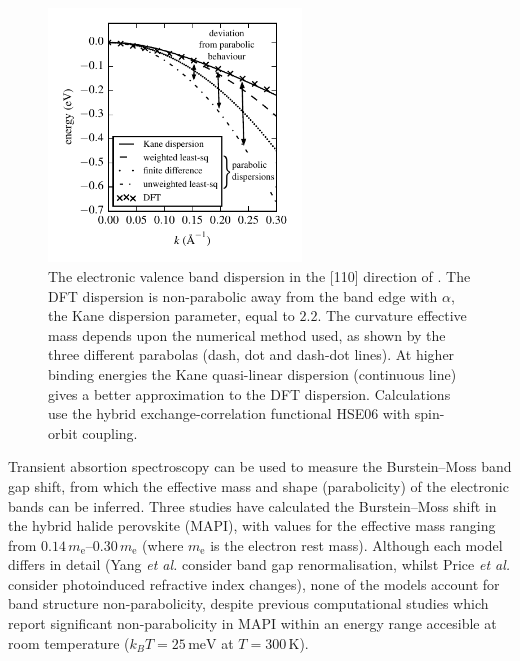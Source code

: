 \begin{figure}[tb] \centering
\includegraphics[width=0.6\textwidth]{./figures/ch4/fits_to_dispersion.pdf}
\caption[Numerical methods for fitting a band dispersion]{\label{dispersion_fits} The electronic valence band dispersion in the [110] direction of . The DFT dispersion is non-parabolic away from the band edge with $\alpha$, the Kane dispersion parameter, equal to ${2.2}$. The curvature effective mass depends upon the numerical method used, as shown by the three different parabolas (dash, dot and dash-dot lines). At higher binding energies the Kane quasi-linear dispersion (continuous line) gives a better approximation to the DFT dispersion. Calculations use the hybrid exchange-correlation functional HSE06 with spin-orbit coupling.}
\end{figure}

Transient absortion spectroscopy can be used to measure the Burstein--Moss band gap shift, from which the effective mass and shape (parabolicity) of the electronic bands can be inferred.
Three studies have calculated the Burstein--Moss shift in the hybrid halide perovskite  (MAPI), with values for the effective mass ranging from $0.14\,m_{\text{e}}$--$0.30\,m_{\text{e}}$ (where $m_{\text{e}}$ is the electron rest mass).\autocite{Manser2014,Yang2015,Price2015}
Although each model differs in detail (Yang \textit{et al.} consider band gap renormalisation,\autocite{Yang2015} whilst Price \textit{et al.} consider photoinduced refractive index changes\autocite{Price2015}), none of the models account for band structure non-parabolicity, despite previous computational studies which report significant non-parabolicity in MAPI within an energy range accesible at room temperature ($k_BT=25\,\mathrm{meV}$ at $T=300\,\mathrm{K}$). 

